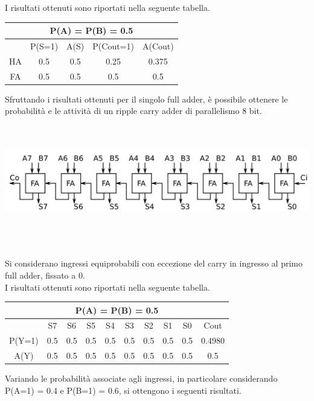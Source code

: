 \documentclass[11pt,  english, makeidx, a4paper, titlepage, oneside]{book}
\begin{document}
I risultati ottenuti sono riportati nella seguente tabella.
\vspace{0.3cm}
\begin{center}
	\begin{tabular}{|c|c|c|c|c|}
	\multicolumn{5}{c}{P(A) = P(B) = 0.5 }\\
	\hline
	  & P(S=1) & A(S) & P(Cout=1) & A(Cout) \\ 
	\hline
	HA & 0.5 & 0.5 & 0.25 & 0.375 \\
	\hline
	FA & 0.5 & 0.5 & 0.5 & 0.5 \\
	\hline
	\end{tabular}
\end{center}
\newpage
Sfruttando i risultati ottenuti per il singolo full adder, è possibile ottenere le probabilità e le attività di un ripple carry adder di parallelismo 8 bit.
\\\\\\
\centerline{\includegraphics[width=15cm]{./img/Lab_1/Es_2/RCA_8_bit.png}}
\\\\\\
Si considerano ingressi equiprobabili con eccezione del carry in ingresso al primo full adder, fissato a 0.\\
I risultati ottenuti sono riportati nella seguente tabella.
\vspace{0.3cm}
\begin{center}
\begin{tabular}{|c|c|c|c|c|c|c|c|c|c|}
\hline
\multicolumn{10}{c}{P(A) = P(B) = 0.5}\\
\hline
 & S7 & S6 & S5 & S4 & S3 & S2 & S1 & S0 & Cout \\
\hline
P(Y=1) & 0.5 & 0.5 & 0.5 & 0.5 & 0.5 & 0.5 & 0.5 & 0.5 & 0.4980 \\
\hline
A(Y) & 0.5 & 0.5 & 0.5 & 0.5 & 0.5 & 0.5 & 0.5 & 0.5 & 0.5 \\
\hline
\end{tabular}
\end{center}
\vspace{0.3cm}
Variando le probabilità associate agli ingressi, in particolare considerando P(A=1) = 0.4 e P(B=1) = 0.6, si ottengono i seguenti risultati.
\end{document}
